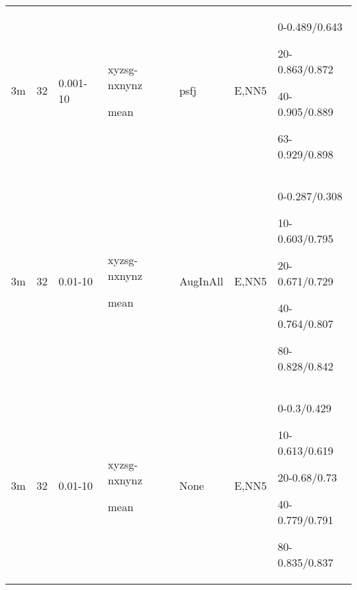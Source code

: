 \documentclass[,table,dvipsnames]{article}
\begin{document}
\begin{tabular}{|p{1.5cm}|p{1cm}|p{2cm}|p{1.5cm}|p{1.5cm}|p{1.5cm}|p{5cm}| }
	\rowcolor{yellow}
	3m & 32 & 0.001-10 & xyzsg-nxnynz\par mean & psfj & E,NN5 & 0-0.489/0.643\par 20-0.863/0.872\par 40-0.905/0.889\par 63-0.929/0.898\\
	
	\rowcolor{blue!20}
	3m & 32 & 0.01-10 & xyzsg-nxnynz\par mean & AugInAll & E,NN5 & 0-0.287/0.308\par 10-0.603/0.795\par 20-0.671/0.729\par 40-0.764/0.807\par 80-0.828/0.842\\
	
	\rowcolor{red!20}
	3m & 32 & 0.01-10 & xyzsg-nxnynz\par mean& None & E,NN5 & 0-0.3/0.429\par 
	10-0.613/0.619\par 20-0.68/0.73\par 40-0.779/0.791\par 80-0.835/0.837\\
	\hline	
\end{tabular}
\end{document}

